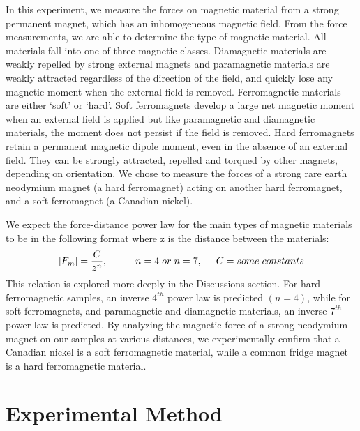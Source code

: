 \documentclass[letterpaper]{article}
\begin{document}
In this experiment, we measure the forces on magnetic material from a strong permanent magnet,
which has an inhomogeneous magnetic field. From the force measurements, we are able to determine the type
of magnetic material. All materials fall into one of three magnetic classes.
Diamagnetic materials are weakly repelled by strong external magnets and paramagnetic materials are weakly attracted
regardless of the direction of the field, and quickly lose any magnetic moment when the external field is removed. Ferromagnetic materials are either `soft' or `hard'. Soft ferromagnets develop
a large net magnetic moment when an external field is applied but like paramagnetic and diamagnetic materials, the moment does not persist if the field is removed.
Hard ferromagnets retain a permanent magnetic dipole moment, even in the absence of an external field. They can be
strongly attracted, repelled and torqued by other magnets, depending on orientation.
We chose to measure the forces of a strong rare earth neodymium magnet (a hard ferromagnet) acting on
another hard ferromagnet, and a soft ferromagnet (a Canadian nickel).

We expect the force-distance power law for the main types of magnetic materials to be in the following format where z is the distance between the materials:
\begin{equation}
 |F_m|=\frac{C}{z^n}, \hspace{1cm}n=4 \hspace{0.1cm} or \hspace{0.1cm} n=7,\hspace{0.5cm} C=some\hspace{0.1cm}constants
\end{equation}
This relation is explored more deeply in the Discussions section.
For hard ferromagnetic samples, an inverse $4^{th}$ power law is predicted $(n=4)$, while for soft ferromagnets, and paramagnetic and diamagnetic materials,
an inverse $7^{th}$ power law is predicted. By analyzing the magnetic force of a strong neodymium magnet on our
samples at various distances, we experimentally confirm that a Canadian nickel is a soft ferromagnetic material, while
a common fridge magnet is a hard ferromagnetic material.

\section{Experimental Method}
\end{document}
